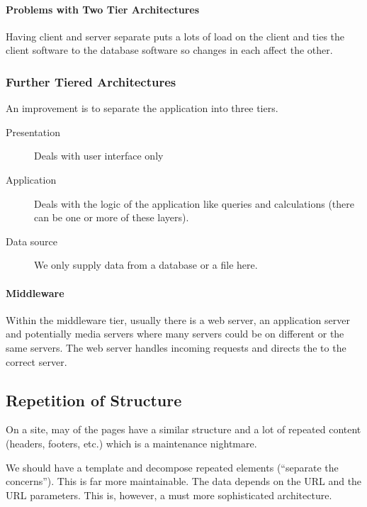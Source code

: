 \paragraph{Problems with Two Tier Architectures}\label{par:problems_with_two_tier_architectures}

Having client and server separate puts a lots of load on the client  and ties the client software to the database software so changes in each affect the other.

\subsubsection{Further Tiered Architectures}\label{ssub:further_tiered_architecures}

An improvement is to separate the application into three tiers.
\begin{description}
	\item[Presentation] Deals with user interface only
	\item[Application] Deals with the logic of the application like queries and calculations (there can be one or more of these layers).
	\item[Data source] We only supply data from a database or a file here.
\end{description}

\paragraph{Middleware}\label{par:middleware}

Within the middleware tier, usually there is a web server, an application server and potentially media servers where many servers could be on different or the same servers.
The web server handles incoming requests and directs the to the correct server.

\subsection{Repetition of Structure}\label{sub:repetition_of_structure}

On a site, may of the pages have a similar structure and a lot of repeated content (headers, footers, etc.) which is a maintenance nightmare.

We should have a template and decompose repeated elements (``separate the concerns'').
This is far more maintainable.
The data depends on the URL and the URL parameters.
This is, however, a must more sophisticated architecture.

